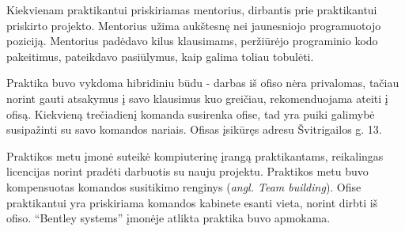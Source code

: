 Kiekvienam praktikantui priskiriamas mentorius, dirbantis prie praktikantui priskirto projekto. Mentorius užima aukštesnę nei jaunesniojo programuotojo poziciją. Mentorius padėdavo kilus klausimams, peržiūrėjo programinio kodo pakeitimus, pateikdavo pasiūlymus, kaip galima toliau tobulėti.

Praktika buvo vykdoma hibridiniu būdu - darbas iš ofiso nėra privalomas, tačiau norint gauti atsakymus į savo klausimus kuo greičiau, rekomenduojama ateiti į ofisą. Kiekvieną trečiadienį komanda susirenka ofise, tad yra puiki galimybė susipažinti su savo komandos nariais. Ofisas įsikūręs adresu Švitrigailos g. 13.

Praktikos metu įmonė suteikė kompiuterinę įrangą praktikantams, reikalingas licencijas norint pradėti darbuotis su nauju projektu. Praktikos metu buvo kompensuotas komandos susitikimo renginys (\emph{angl. Team building}). Ofise praktikantui yra priskiriama komandos kabinete esanti vieta, norint dirbti iš ofiso. \enquote{Bentley systems} įmonėje atlikta praktika buvo apmokama.